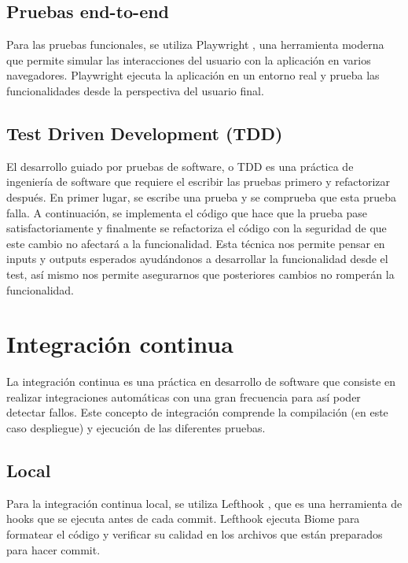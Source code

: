 \subsection{Pruebas end-to-end}
Para las pruebas funcionales, se utiliza Playwright \cite{playwright}, una herramienta moderna que permite simular las interacciones del usuario con la aplicación en varios navegadores. Playwright ejecuta la aplicación en un entorno real y prueba las funcionalidades desde la perspectiva del usuario final.

\subsection{Test Driven Development (TDD)}
El desarrollo guiado por pruebas de software, o TDD es una práctica de ingeniería de software que requiere el escribir las pruebas primero y refactorizar después. En primer lugar, se escribe una prueba y se comprueba que esta prueba falla. A continuación, se implementa el código que hace que la prueba pase satisfactoriamente y finalmente se refactoriza el código con la seguridad de que este cambio no afectará a la funcionalidad. Esta técnica nos permite pensar en inputs y outputs esperados ayudándonos a desarrollar la funcionalidad desde el test, así mismo nos permite asegurarnos que posteriores cambios no romperán la funcionalidad.

\section{Integración continua}
La integración continua es una práctica en desarrollo de software que consiste en realizar integraciones automáticas con una gran frecuencia para así poder detectar fallos. Este concepto de integración comprende la compilación (en este caso despliegue) y ejecución de las diferentes pruebas.

\subsection{Local}
Para la integración continua local, se utiliza Lefthook \cite{lefthook}, que es una herramienta de hooks que se ejecuta antes de cada commit. Lefthook ejecuta Biome para formatear el código y verificar su calidad en los archivos que están preparados para hacer commit.

